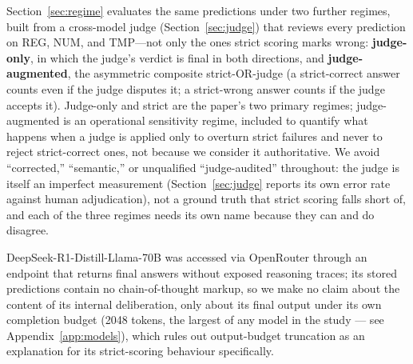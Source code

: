 Section~\ref{sec:regime} evaluates the same predictions under two further regimes, built from a
cross-model judge (Section~\ref{sec:judge}) that reviews every prediction on REG, NUM, and TMP---not
only the ones strict scoring marks wrong: \textbf{judge-only}, in which the judge's verdict is final
in both directions, and \textbf{judge-augmented}, the asymmetric composite strict-OR-judge (a
strict-correct answer counts even if the judge disputes it; a strict-wrong answer counts if the judge
accepts it). Judge-only and strict are the paper's two primary regimes; judge-augmented is an
operational sensitivity regime, included to quantify what happens when a judge is applied only to
overturn strict failures and never to reject strict-correct ones, not because we consider it
authoritative. We avoid ``corrected,'' ``semantic,'' or unqualified ``judge-audited'' throughout:
the judge is itself an imperfect measurement (Section~\ref{sec:judge} reports its own error rate
against human adjudication), not a ground truth that strict scoring falls short of, and each of the
three regimes needs its own name because they can and do disagree.

DeepSeek-R1-Distill-Llama-70B was accessed via OpenRouter through an endpoint that returns final
answers without exposed reasoning traces; its stored predictions contain no chain-of-thought markup,
so we make no claim about the content of its internal deliberation, only about its final output
under its own completion budget (2048 tokens, the largest of any model in the study --- see
Appendix~\ref{app:models}), which rules out output-budget truncation as an explanation for its
strict-scoring behaviour specifically.
